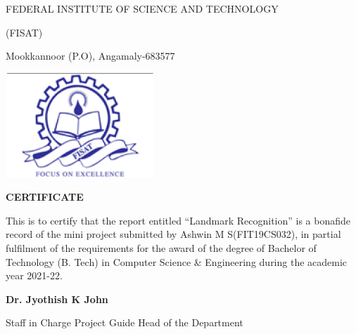 \documentclass[10pt]{article} %
\begin{document}
\begin{Center}
\centering FEDERAL INSTITUTE OF SCIENCE AND TECHNOLOGY

(FISAT)

Mookkannoor (P.O), Angamaly-683577


\vspace{5mm}


\noindent                   \includegraphics*[width=2.22in, height=1.55in, keepaspectratio=false, trim=0.00in 0.00in 0.00in 0.02in]{image2}

\vspace{10mm}
\centering         \textbf{\large CERTIFICATE}
\vspace{7mm}
\textbf{}

\justifying
\noindent 
This is to certify that the report entitled ``Landmark Recognition'' is a bonafide record of the mini project submitted by Ashwin M S(FIT19CS032), in partial fulfilment of the requirements for the award of the degree of Bachelor of Technology (B. Tech) in Computer Science \& Engineering during the academic year 2021-22.

\vspace{50mm} 
\end{Center}

\hspace{80mm}              \textbf{Dr. Jyothish K John}

Staff in Charge    \hspace{15mm}        Project Guide   \hspace{15mm}    Head of the Department 

\noindent 

\noindent 

\noindent 

\noindent 

\noindent 

\noindent 

\noindent 

\noindent 
\end{document}
